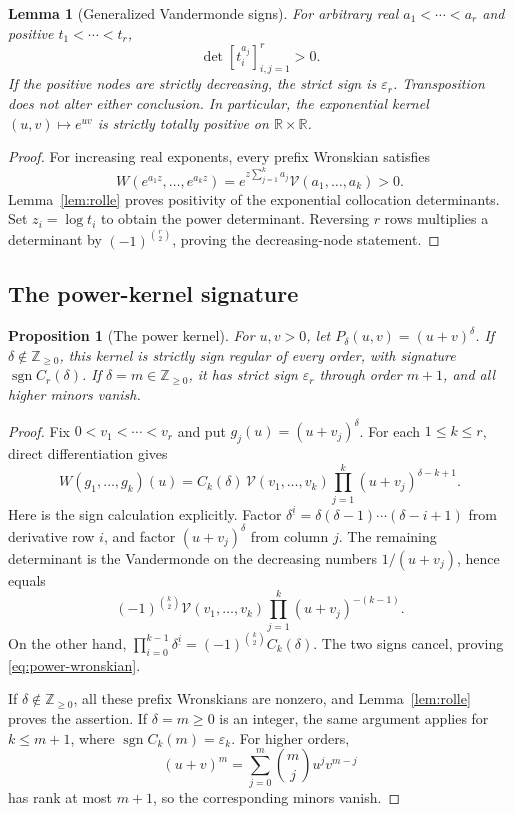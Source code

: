 \documentclass[11pt,a4paper]{article}
\newtheorem{lemma}[theorem]{Lemma}
\newtheorem{proposition}[theorem]{Proposition}
\theoremstyle{definition}
\theoremstyle{remark}
\DeclareMathOperator{\sgn}{sgn}
\newcommand{\R}{\mathbb R}
\newcommand{\Z}{\mathbb Z}
\newcommand{\ep}{\varepsilon}
\newcommand{\V}{\mathcal V}
\begin{document}
\begin{lemma}[Generalized Vandermonde signs]\label{lem:monomials}
For arbitrary real \(a_1<\cdots<a_r\) and positive
\(t_1<\cdots<t_r\),
\begin{equation}\label{cg:generalized-vandermonde}
 \det[t_i^{a_j}]_{i,j=1}^r>0.
\end{equation}
If the positive nodes are strictly decreasing, the strict sign is
\(\ep_r\). Transposition does not alter either conclusion.
In particular, the exponential kernel \((u,v)\mapsto e^{uv}\)
is strictly totally positive on \(\R\times\R\).
\end{lemma}
\begin{proof}
For increasing real exponents, every prefix Wronskian satisfies
\[
 W(e^{a_1z},\ldots,e^{a_kz})
 =e^{z\sum_{j=1}^k a_j}\V(a_1,\ldots,a_k)>0.
\]
Lemma~\ref{lem:rolle} proves positivity of the exponential
collocation determinants. Set \(z_i=\log t_i\) to obtain the
power determinant. Reversing \(r\) rows multiplies a determinant
by \((-1)^{\binom r2}\), proving the decreasing-node statement.
\end{proof}

\subsection{The power-kernel signature}

\begin{proposition}[The power kernel]\label{prop:power}
For \(u,v>0\), let \(P_\delta(u,v)=(u+v)^\delta\).
If \(\delta\notin\Z_{\ge0}\), this kernel is strictly sign regular of
every order, with signature \(\sgn C_r(\delta)\).
If \(\delta=m\in\Z_{\ge0}\), it has strict sign \(\ep_r\) through
order \(m+1\), and all higher minors vanish.
\end{proposition}

\begin{proof}
Fix \(0<v_1<\cdots<v_r\) and put \(g_j(u)=(u+v_j)^\delta\).
For each \(1\le k\le r\), direct differentiation gives
\begin{equation}\label{eq:power-wronskian}
 W(g_1,\ldots,g_k)(u)
 =C_k(\delta)\,\V(v_1,\ldots,v_k)
   \prod_{j=1}^{k}(u+v_j)^{\delta-k+1}.
\end{equation}
Here is the sign calculation explicitly. Factor
\(\delta^{\underline i}=\delta(\delta-1)\cdots(\delta-i+1)\)
from derivative row \(i\), and factor \((u+v_j)^\delta\) from column
\(j\). The remaining determinant is the Vandermonde on the decreasing
numbers \(1/(u+v_j)\), hence equals
\[
 (-1)^{\binom k2}\V(v_1,\ldots,v_k)
 \prod_{j=1}^{k}(u+v_j)^{-(k-1)}.
\]
On the other hand,
\(\prod_{i=0}^{k-1}\delta^{\underline i}
 =(-1)^{\binom k2}C_k(\delta)\).
The two signs cancel, proving \eqref{eq:power-wronskian}.

If \(\delta\notin\Z_{\ge0}\), all these prefix Wronskians are
nonzero, and Lemma~\ref{lem:rolle} proves the assertion. If
\(\delta=m\ge0\) is an integer, the same argument applies for
\(k\le m+1\), where \(\sgn C_k(m)=\ep_k\). For higher orders,
\[
 (u+v)^m=\sum_{j=0}^{m}\binom mj u^jv^{m-j}
\]
has rank at most \(m+1\), so the corresponding minors vanish.
\end{proof}
\end{document}
